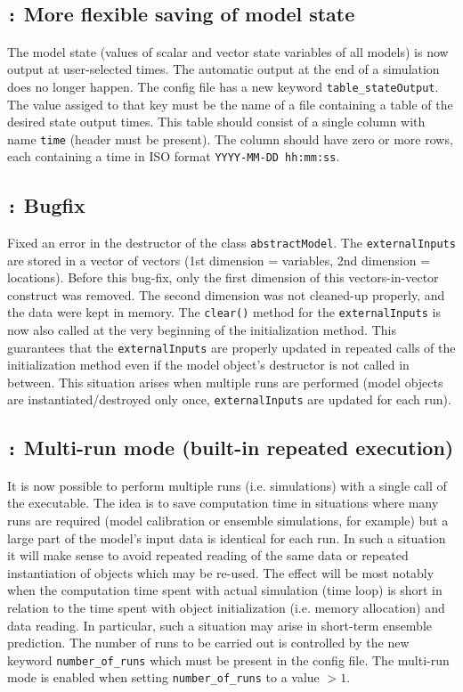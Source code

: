 \documentclass[a4paper,10pt]{article}
\newcommand{\logentry}[2]{\subsection*{\texttt{\color{red}{#1}:} \large{\textbf{#2}}}}
\begin{document}

\logentry{2011-09-01}{More flexible saving of model state}
The model state (values of scalar and vector state variables of all models) is now output at user-selected times. The automatic output at the end of a simulation does no longer happen. The config file has a new keyword \verb!table_stateOutput!. The value assiged to that key must be the name of a file containing a table of the desired state output times. This table should consist of a single column with name \verb!time! (header must be present). The column should have zero or more rows, each containing a time in ISO format \verb!YYYY-MM-DD hh:mm:ss!.


\logentry{2011-08-20}{Bugfix}
Fixed an error in the destructor of the class \verb!abstractModel!. The \verb!externalInputs! are stored in a vector of vectors (1st dimension = variables, 2nd dimension = locations). Before this bug-fix, only the first dimension of this vectors-in-vector construct was removed. The second dimension was not cleaned-up properly, and the data were kept in memory. The \verb!clear()! method for the \verb!externalInputs! is now also called at the very beginning of the initialization method. This guarantees that the \verb!externalInputs! are properly updated in repeated calls of the initialization method even if the model object's destructor is not called in between. This situation arises when multiple runs are performed (model objects are instantiated/destroyed only once, \verb!externalInputs! are updated for each run).


\logentry{2011-08-19}{Multi-run mode (built-in repeated execution)}
It is now possible to perform multiple runs (i.e. simulations) with a single call of the executable. The idea is to save computation time in situations where many runs are required (model calibration or ensemble simulations, for example) but a large part of the model's input data is identical for each run. In such a situation it will make sense to avoid repeated reading of the same data or repeated instantiation of objects which may be re-used. The effect will be most notably when the computation time spent with actual simulation (time loop) is short in relation to the time spent with object initialization (i.e. memory allocation) and data reading. In particular, such a situation may arise in short-term ensemble prediction. The number of runs to be carried out is controlled by the new keyword \verb!number_of_runs! which must be present in the config file. The multi-run mode is enabled when setting \verb!number_of_runs! to a value $>1$.
\end{document}
